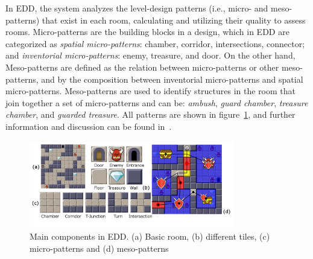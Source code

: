 In EDD, the system analyzes the level-design patterns (i.e., micro- and meso-patterns) that exist in each room, calculating and utilizing their quality to assess rooms. Micro-patterns are the building blocks in a design, which in EDD are categorized as \textit{spatial micro-patterns}: chamber, corridor, intersections, connector; and \textit{inventorial micro-patterns}: enemy, treasure, and door. On the other hand, Meso-patterns are defined as the relation between micro-patterns or other meso-patterns, and by the composition between inventorial micro-patterns and spatial micro-patterns. Meso-patterns are used to identify structures in the room that join together a set of micro-patterns and can be: \textit{ambush}, \textit{guard chamber}, \textit{treasure chamber}, and \textit{guarded treasure}. All patterns are shown in figure~\ref{fig:basecomponents}, and further information and discussion can be found in~\cite{p9Baldwin2017,Alvarez2018}.

\begin{figure}[b]
\centerline{\includegraphics[width=9cm]{figures/figure1.png}}
\caption{Main components in EDD. (a) Basic room, (b) different tiles, (c) micro-patterns and (d) meso-patterns}
\label{fig:basecomponents}
\end{figure}




